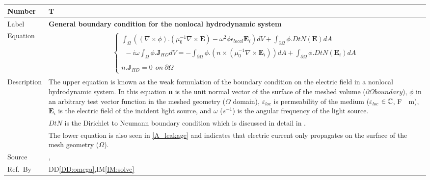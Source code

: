 \documentclass[12pt]{article}
\newcommand{\colBwidth}{0.82\textwidth} \newcommand{\colCwidth}{0.1\textwidth}
\begin{document}
	~\newline
	
	~\newline
	
	\noindent \begin{minipage}{\textwidth} \renewcommand*{\arraystretch}{1.5}
		\begin{tabular}{| p{\colAwidth} | p{\colBwidth}|} \hline \rowcolor[gray]{0.9}
			Number& T{theorynum}\thetheorynum \label{TM:boundary}\\ \hline
			Label&\bf General boundary condition for the nonlocal hydrodynamic system  \\
			\hline Equation& \begin{equation} \label{eq:boundary} \begin{gathered}
					\begin{cases} \int_\Omega ((\nabla \times \phi).(\mu^{-1}_{0} \nabla \times
						\textbf{E})- \omega^2\phi \epsilon_{local} \textbf{E}_i)dV + \int_{\partial
							\Omega} \phi . DtN(\textbf{E})dA\\ \ \ - i\omega \int_\Omega \phi .
						\textbf{J}_{HD}dV =  -\int_{\partial \Omega} \phi.(n \times (\mu^{-1}_0 \nabla
						\times \textbf{E}_i))dA + \int_{\partial \Omega} \phi.DtN(\textbf{E}_i)dA \\ \\
						n.\textbf{J}_{HD}=0 \ \ on \ \partial \Omega \end{cases} \end{gathered} 
			\end{equation} \\
			
			
			\hline Description & The upper equation is known as the weak formulation of
			the boundary condition on the electric field in a nonlocal hydrodynamic
			system. In this equation \textbf{n} is the unit normal vector of the surface
			of the meshed volume ($\partial \Omega boundary$), $\phi$ in an arbitrary test
			vector function in the meshed geometry ($\Omega$ domain), $\varepsilon_{loc}$
			is permeability of the medium ($\varepsilon_{loc}$ $\in \Bbb C$, \si{\farad
				\per \meter}), $\textbf{E}_i$ is the electric field of the incident light
			source, and $\omega$ ($s^{-1}$) is the angular frequency of the light source.
			\\ &$DtN$ is the Dirichlet to Neumann boundary condition which is discussed in
			detail in \cite{monk2003finite}. \\ & The lower equation is also seen in
			\ref{A_leakage} and indicates that electric current only propagates on the
			surface of the mesh geometry ($\Omega$). \\ \hline Source &
			\cite{hiremath2012numerical}, \cite{monk2003finite} \\ %
			\hline Ref.\ By & DD\ref{DD:omega},IM\ref{IM:solve}\\ \hline \end{tabular}
	\end{minipage}\\
	
\end{document}
